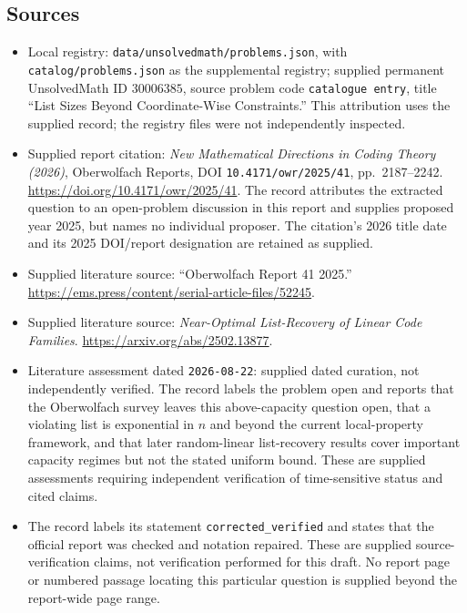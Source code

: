 \documentclass[11pt]{article}
\begin{document}
\subsection{Sources}
\begin{itemize}
\item Local registry: \texttt{data/unsolvedmath/problems.json}, with \texttt{catalog/problems.json} as the supplemental registry; supplied permanent UnsolvedMath ID \(30006385\), source problem code \texttt{catalogue entry}, title ``List Sizes Beyond Coordinate-Wise Constraints.'' This attribution uses the supplied record; the registry files were not independently inspected.
\item Supplied report citation: \emph{New Mathematical Directions in Coding Theory (2026)}, Oberwolfach Reports, DOI \texttt{10.4171/owr/2025/41}, pp.\ 2187--2242. \url{https://doi.org/10.4171/owr/2025/41}. The record attributes the extracted question to an open-problem discussion in this report and supplies proposed year 2025, but names no individual proposer. The citation's 2026 title date and its 2025 DOI/report designation are retained as supplied.
\item Supplied literature source: ``Oberwolfach Report 41 2025.'' \url{https://ems.press/content/serial-article-files/52245}.
\item Supplied literature source: \emph{Near-Optimal List-Recovery of Linear Code Families}. \url{https://arxiv.org/abs/2502.13877}.
\item Literature assessment dated \texttt{2026-08-22}: supplied dated curation, not independently verified. The record labels the problem open and reports that the Oberwolfach survey leaves this above-capacity question open, that a violating list is exponential in \(n\) and beyond the current local-property framework, and that later random-linear list-recovery results cover important capacity regimes but not the stated uniform bound. These are supplied assessments requiring independent verification of time-sensitive status and cited claims.
\item The record labels its statement \texttt{corrected\_verified} and states that the official report was checked and notation repaired. These are supplied source-verification claims, not verification performed for this draft. No report page or numbered passage locating this particular question is supplied beyond the report-wide page range.
\end{itemize}
\end{document}
